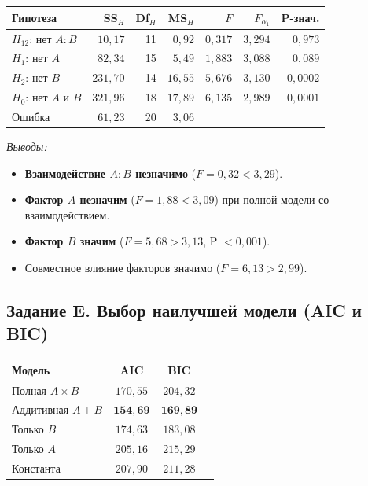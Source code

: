 \documentclass[12pt,a4paper]{article}
\begin{document}
\begin{center}
\begin{tabular}{lrrrrrr}
\toprule
Гипотеза & SS$_H$ & Df$_H$ & MS$_H$ & $F$ & $F_{\alpha_1}$ & P-знач. \\
\midrule
$H_{12}$: нет $A\!:\!B$   & $10{,}17$  & 11 & $0{,}92$  & $0{,}317$  & $3{,}294$ & $0{,}973$ \\
$H_1$: нет $A$             & $82{,}34$  & 15 & $5{,}49$  & $1{,}883$  & $3{,}088$ & $0{,}089$ \\
$H_2$: нет $B$             & $231{,}70$ & 14 & $16{,}55$ & $5{,}676$  & $3{,}130$ & $0{,}0002$ \\
$H_0$: нет $A$ и $B$       & $321{,}96$ & 18 & $17{,}89$ & $6{,}135$  & $2{,}989$ & $0{,}0001$ \\
\midrule
Ошибка & $61{,}23$ & 20 & $3{,}06$ & & & \\
\bottomrule
\end{tabular}
\end{center}

\textit{Выводы:}
\begin{itemize}
  \item \textbf{Взаимодействие $A:B$ незначимо} ($F = 0{,}32 < 3{,}29$).
  \item \textbf{Фактор $A$ незначим} ($F = 1{,}88 < 3{,}09$) при полной модели со взаимодействием.
  \item \textbf{Фактор $B$ значим} ($F = 5{,}68 > 3{,}13$, P $< 0{,}001$).
  \item Совместное влияние факторов значимо ($F = 6{,}13 > 2{,}99$).
\end{itemize}

\subsection{Задание E. Выбор наилучшей модели (AIC и BIC)}

\begin{center}
\begin{tabular}{lccc}
\toprule
Модель & AIC & BIC \\
\midrule
Полная $A\!\times\! B$ & $170{,}55$ & $204{,}32$ \\
Аддитивная $A + B$ & $\mathbf{154{,}69}$ & $\mathbf{169{,}89}$ \\
Только $B$          & $174{,}63$ & $183{,}08$ \\
Только $A$          & $205{,}16$ & $215{,}29$ \\
Константа           & $207{,}90$ & $211{,}28$ \\
\bottomrule
\end{tabular}
\end{center}
\end{document}
